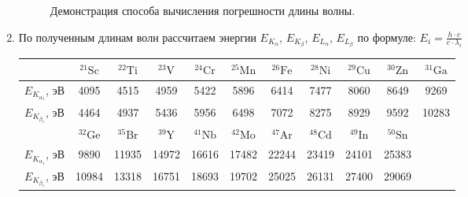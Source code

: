 \documentclass[a4paper, 12pt]{article}%
\begin{document}
\begin{enumerate}
	  	\begin{figure}[H]
		  	\caption{Демонстрация способа вычисления погрешности длины волны.}
		  \end{figure}
		 

		 
		\item По полученным длинам волн рассчитаем энергии $E_{K_\alpha}$, $E_{K_\beta}$, $E_{L_\alpha}$, $E_{L_\beta}$ по формуле: $E_i = \frac{h \cdot c}{e\cdot\lambda_i} $
		
		
		\begin{longtable}{|c|c|c|c|c|c|c|c|c|c|c|}
			\hline
			& ${ }^{21} \mathrm{Sc}$ & ${ }^{22} \mathrm{Ti}$ & ${}^{23} \mathrm{V}$ & ${ }^{24} \mathrm{Cr}$ & ${ }^{25} \mathrm{Mn}$ & ${ }^{26} \mathrm{Fe}$ & ${ }^{28} \mathrm{Ni}$ & ${ }^{29} \mathrm{Cu}$ & ${ }^{30} \mathrm{Zn}$ & ${ }^{31} \mathrm{Ga}$ \\ \hline
			
			$E_{K_{\alpha_1}}$, эВ & 4095 & 4515 & 4959 & 5422 & 5896 & 6414 & 7477 & 8060 & 8649 & 9269 \\ \hline
			$E_{K_{\beta_1}}$, эВ & 4464 &  4937 &  5436 &  5956 &  6498 &  7072 &  8275 &  8929 &  9592 &  10283
			 \\ \hline
			\hline
			& ${ }^{32} \mathrm{Ge}$ & ${}^{35} \mathrm{Br}$ & ${ }^{39} \mathrm{Y}$ & ${ }^{41} \mathrm{Nb}$ & ${ }^{42} \mathrm{Mo}$ & ${ }^{47} \mathrm{Ar}$ & ${ }^{48} \mathrm{Cd}$ & ${ }^{49} \mathrm{In}$ & ${ }^{50} \mathrm{Sn}$ & \\ \hline
			
			$E_{K_{\alpha_1}}$, эВ & 9890 & 11935 & 14972 & 16616 & 17482 & 22244 & 23419 & 24101 & 25383 &\\ \hline
			$E_{K_{\beta_1}}$, эВ &   10984 &  13318 &  16751 &  18693 &  19702 &  25025 &  26131 &  27400 &  29069 & \\ 
			\hline
			\hline
			

\end{longtable}
\end{enumerate}
\end{document}
